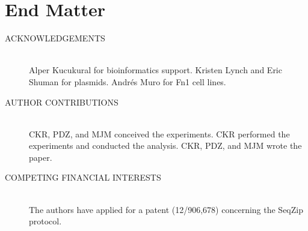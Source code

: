 \section{End Matter}\label{SeqZipPaper:sec:End Matter}

	\begin{description}

		\item[ACKNOWLEDGEMENTS] \hfill \\
		Alper Kucukural for bioinformatics support. Kristen Lynch and Eric Shuman for plasmids. Andrés Muro for Fn1 cell lines. 

		\item[AUTHOR CONTRIBUTIONS] \hfill \\
		CKR, PDZ, and MJM conceived the experiments. CKR performed the experiments and conducted the analysis. CKR, PDZ, and MJM wrote the paper. 

		\item[COMPETING FINANCIAL INTERESTS] \hfill \\
		The authors have applied for a patent (12/906,678) concerning the SeqZip protocol. 

		\end{description}

